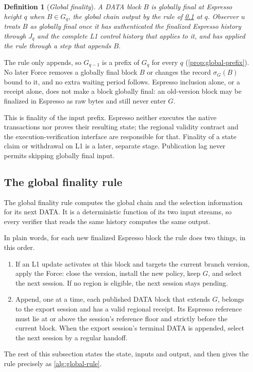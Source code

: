 \documentclass[11pt,a4paper]{article}
\newcommand{\defterm}[1]{\textcolor{rrBlue}{\textit{#1}}}
\newtheorem{definition}{Definition}[section]
\begin{document}
\begin{definition}[\defterm{Global finality}]
\label{def:global-finality}
A DATA block $B$ is \defterm{globally final at Espresso height $q$} when
$B\in G_q$, the global chain output by the rule of \cref{sec:exports} at
$q$. Observer $u$ treats $B$ as globally final once it has authenticated
the finalized Espresso history through $J_q$ and the complete L1 control
history that applies to it, and has applied the rule through a step that
appends $B$.
\end{definition}

The rule only appends, so $G_{q-1}$ is a prefix of $G_q$ for every $q$
(\cref{prop:global-prefix}). No later Force removes a globally final
block $B$ or changes the record $\sigma_G(B)$ bound to it, and no extra waiting period
follows. Espresso inclusion alone, or a receipt alone, does not make a
block globally final: an old-version block may be finalized in Espresso
as raw bytes and still never enter $G$.

This is finality of the input prefix. Espresso neither executes the
native transactions nor proves their resulting state; the regional
validity contract and the execution-verification interface are
responsible for that. Finality of a state claim or withdrawal on L1 is a
later, separate stage. Publication lag never permits skipping globally
final input.

\subsection{The global finality rule}
\label{sec:exports}
The global finality rule computes the global chain and the selection
information for its next DATA. It is a deterministic function of its
two input streams, so every verifier that reads the same history
computes the same output.

In plain words, for each new finalized Espresso block the rule does two
things, in this order.
\begin{enumerate}[label=(\arabic*),itemsep=1pt]
\item If an L1 update activates at this block and targets the current
branch version, apply the Force: close the version, install the new policy,
keep $G$, and select the next session. If no region is eligible, the
next session stays pending.
\item Append, one at a time, each published DATA block that extends
$G$, belongs to the export session and has a valid regional receipt.
Its Espresso reference must lie at or above the session's reference
floor and strictly before the current block. When the export session's
terminal DATA is appended, select the next session by a regular
handoff.
\end{enumerate}
The rest of this subsection states the state, inputs and output, and
then gives the rule precisely as \cref{alg:global-rule}.
\end{document}
